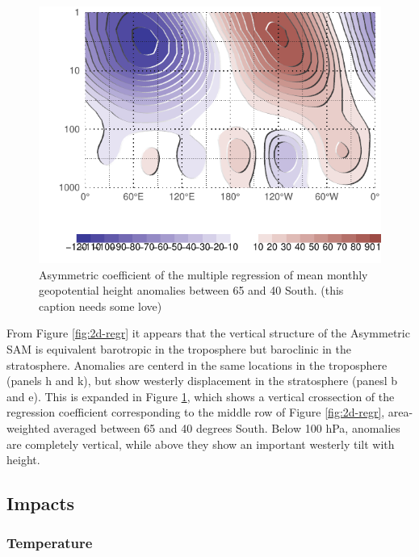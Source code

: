 \documentclass[]{ametsocV5}
\begin{document}
\begin{figure}
\includegraphics{vertical-regression-1} \caption[Asymmetric coefficient of the multiple regression of mean monthly geopotential height anomalies between 65 and 40 South]{Asymmetric coefficient of the multiple regression of mean monthly geopotential height anomalies between 65 and 40 South. (this caption needs some love)}\label{fig:vertical-regression}
\end{figure}

From Figure \ref{fig:2d-regr} it appears that the vertical structure of
the Asymmetric SAM is equivalent barotropic in the troposphere but
baroclinic in the stratosphere. Anomalies are centerd in the same
locations in the troposphere (panels h and k), but show westerly
displacement in the stratosphere (panesl b and e). This is expanded in
Figure \ref{fig:vertical-regression}, which shows a vertical crossection
of the regression coefficient corresponding to the middle row of Figure
\ref{fig:2d-regr}, area-weighted averaged between 65 and 40 degrees
South. Below 100 hPa, anomalies are completely vertical, while above
they show an important westerly tilt with height.

\subsection{Impacts}

\subsubsection{Temperature}
\end{document}
